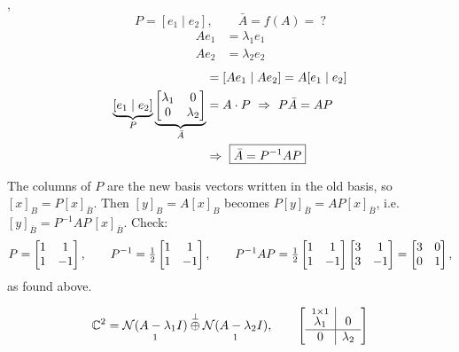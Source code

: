\sep
\[
P=[e_1\mid e_2],\qquad \bar{A}=f(A)=\ ?
\]
\[
\begin{aligned}Ae_1&=\lambda_1e_1\\Ae_2&=\lambda_2e_2\end{aligned}
\]
\begin{align*}
[\lambda_1e_1\mid\lambda_2e_2]&=[Ae_1\mid Ae_2]=A[e_1\mid e_2]\\
\underbrace{[e_1\mid e_2]}_{P}\underbrace{\bmat{\lambda_1&0\\0&\lambda_2}}_{\bar{A}}&=A\cdot P
\ \Rightarrow\ P\bar{A}=AP\\
&\Rightarrow\ \boxed{\bar{A}=P^{-1}AP}
\end{align*}
\begin{insight}
The columns of $P$ are the new basis vectors written in the old basis, so $[x]_B=P[x]_{\bar B}$. Then $[y]_B=A[x]_B$ becomes $P[y]_{\bar B}=AP[x]_{\bar B}$, i.e.\ $[y]_{\bar B}=P^{-1}AP\,[x]_{\bar B}$. Check:
\[
P=\begin{bmatrix}1&1\\1&-1\end{bmatrix},\qquad P^{-1}=\tfrac12\begin{bmatrix}1&1\\1&-1\end{bmatrix},\qquad
P^{-1}AP=\tfrac12\begin{bmatrix}1&1\\1&-1\end{bmatrix}\begin{bmatrix}3&1\\3&-1\end{bmatrix}=\begin{bmatrix}3&0\\0&1\end{bmatrix},
\]
as found above.
\end{insight}
\[
\mathbb{C}^2=\underset{1}{\mathcal{N}(A-\lambda_1I)}\overset{\perp}{\oplus}\underset{1}{\mathcal{N}(A-\lambda_2I)},
\qquad
\left[\begin{array}{c|c}\overset{1\times1}{\lambda_1}&0\\\hline 0&\lambda_2\end{array}\right]
\]

